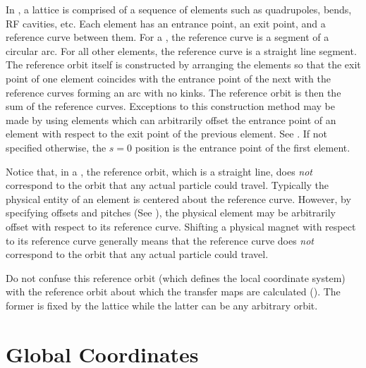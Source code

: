 In \bmad, a lattice is comprised of a sequence of elements such as
quadrupoles, bends, RF cavities, etc. Each element has an entrance
point, an exit point, and a reference curve between them. For a
, the reference curve is a segment of a circular arc. For all
other elements, the reference curve is a straight line segment. The
reference orbit itself is constructed by arranging the elements so
that the exit point of one element coincides with the entrance point
of the next with the reference curves forming an arc with no kinks.
The reference orbit is then the sum of the reference
curves. Exceptions to this construction method may be made by using
 elements which can arbitrarily offset the entrance point of
an element with respect to the exit point of the previous element.
See .  If not specified otherwise, the $s = 0$ position
is the entrance point of the first element.

Notice that, in a , the reference orbit, which is a
straight line, does {\em not} correspond to the orbit that any actual
particle could travel. Typically the physical entity of an element is
centered about the reference curve. However, by specifying offsets and
pitches (See ), the physical element may be
arbitrarily offset with respect to its reference curve.  Shifting a
physical magnet with respect to its reference curve generally means
that the reference curve does {\em not} correspond to the orbit that
any actual particle could travel.

Do not confuse this reference orbit (which defines the local
coordinate system) with the reference orbit about which the transfer
maps are calculated (). The former is fixed by the
lattice while the latter can be any arbitrary orbit.

\section{Global Coordinates}
\label{s:global}

